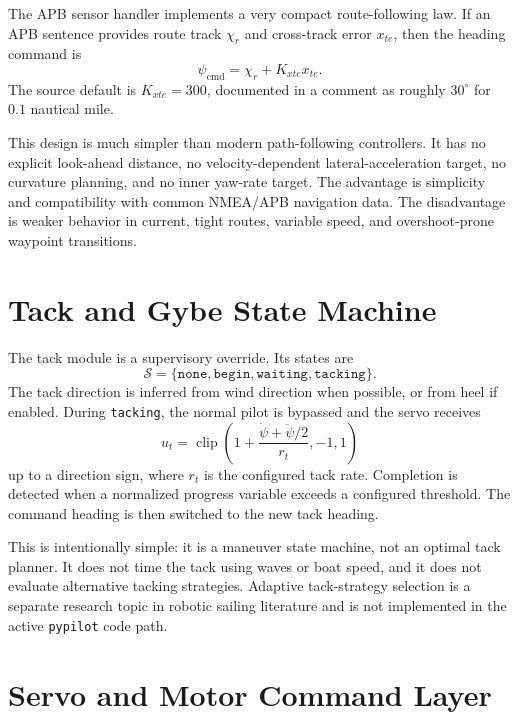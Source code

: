 \documentclass[10pt,twocolumn]{article}
\newcommand{\clip}{\operatorname{clip}}
\newcommand{\heading}{\psi}
\newcommand{\cmd}{\mathrm{cmd}}
\begin{document}
The APB sensor handler implements a very compact route-following law.  If an APB sentence
provides route track \(\chi_r\) and cross-track error \(x_{te}\), then the heading command
is
\begin{equation}
  \heading_{\cmd} = \chi_r + K_{xte} x_{te}.
  \label{eq:apb}
\end{equation}
The source default is \(K_{xte}=300\), documented in a comment as roughly
\(30^{\circ}\) for \(0.1\) nautical mile.

This design is much simpler than modern path-following controllers.  It has no explicit
look-ahead distance, no velocity-dependent lateral-acceleration target, no curvature
planning, and no inner yaw-rate target.  The advantage is simplicity and compatibility
with common NMEA/APB navigation data.  The disadvantage is weaker behavior in current,
tight routes, variable speed, and overshoot-prone waypoint transitions.

\section{Tack and Gybe State Machine}

The tack module is a supervisory override.  Its states are
\begin{equation}
  \mathcal{S}=\{\texttt{none},\texttt{begin},\texttt{waiting},\texttt{tacking}\}.
\end{equation}
The tack direction is inferred from wind direction when possible, or from heel if enabled.
During \texttt{tacking}, the normal pilot is bypassed and the servo receives
\begin{equation}
  u_t = \clip\!\left(1 + \frac{\dot{\heading}+\ddot{\heading}/2}{r_t}, -1, 1\right)
\end{equation}
up to a direction sign, where \(r_t\) is the configured tack rate.  Completion is detected
when a normalized progress variable exceeds a configured threshold.  The command heading
is then switched to the new tack heading.

This is intentionally simple: it is a maneuver state machine, not an optimal tack planner.
It does not time the tack using waves or boat speed, and it does not evaluate alternative
tacking strategies.  Adaptive tack-strategy selection is a separate research topic in
robotic sailing literature and is not implemented in the active \texttt{pypilot} code path.

\section{Servo and Motor Command Layer}
\end{document}
